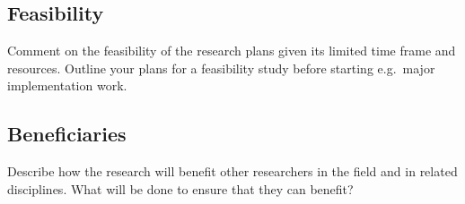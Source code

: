 \subsection{Feasibility}

Comment on the feasibility of the research plans given its limited time frame and resources. Outline your plans for a feasibility study before starting e.g.\ major implementation work.

\subsection{Beneficiaries}

Describe how the research will benefit other researchers in the field and in related disciplines. What will be done to ensure that they can benefit?